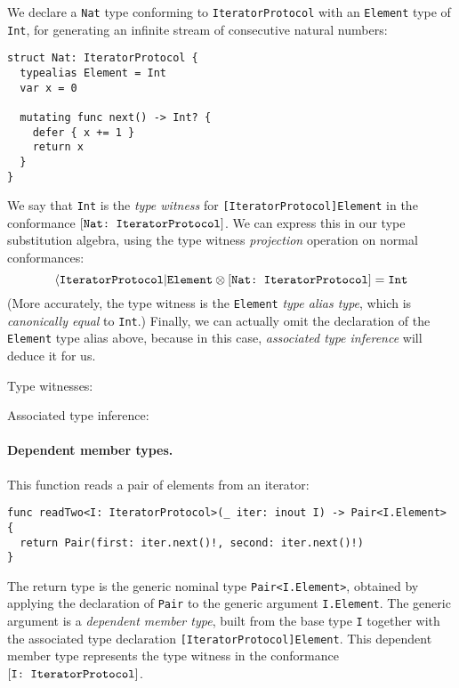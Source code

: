 \documentclass[../generics]{subfiles}
\begin{document}
We declare a \texttt{Nat} type conforming to \texttt{IteratorProtocol} with an \texttt{Element} type of \texttt{Int}, for generating an infinite stream of consecutive natural numbers:
\begin{Verbatim}
struct Nat: IteratorProtocol {
  typealias Element = Int
  var x = 0
  
  mutating func next() -> Int? {
    defer { x += 1 }
    return x
  }
}
\end{Verbatim}
We say that \texttt{Int} is the \emph{type witness} for \texttt{[IteratorProtocol]Element} in the conformance $[\texttt{Nat:~IteratorProtocol}]$. We can express this in our type substitution algebra, using the type witness \emph{projection} operation on normal conformances:
\[\langle\texttt{IteratorProtocol}|\texttt{Element}\otimes [\texttt{Nat:~IteratorProtocol}] = \texttt{Int}\]
(More accurately, the type witness is the \texttt{Element} \emph{type alias type}, which is \emph{canonically equal} to \texttt{Int}.) Finally, we can actually omit the declaration of the \texttt{Element} type alias above, because in this case, \emph{associated type inference} will deduce it for us.

\begin{MoreDetails}
\item Type witnesses: 
\item Associated type inference: 
\end{MoreDetails}

\paragraph{Dependent member types.} This function reads a pair of elements from an iterator:
\begin{Verbatim}
func readTwo<I: IteratorProtocol>(_ iter: inout I) -> Pair<I.Element> {
  return Pair(first: iter.next()!, second: iter.next()!)
}
\end{Verbatim}
The return type is the generic nominal type \texttt{Pair<I.Element>}, obtained by applying the declaration of \texttt{Pair} to the generic argument \texttt{I.Element}. The generic argument is a \emph{dependent member type}, built from the base type \texttt{I} together with the associated type declaration \texttt{[IteratorProtocol]Element}. This dependent member type represents the type witness in the conformance $[\texttt{I:~IteratorProtocol}]$.
\end{document}
